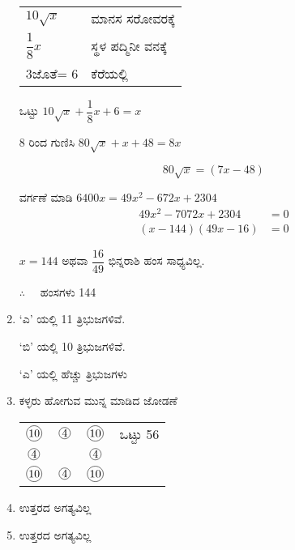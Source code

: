 \begin{enumerate}
\begin{tabular}[t]{ll}
$10 \sqrt{x}$ & ಮಾನಸ ಸರೋವರಕ್ಕೆ \\
$\dfrac{1}{8} x$ & ಸ್ಥಳ ಪದ್ಮಿನೀ ವನಕ್ಕೆ \\
$3$ಜೊತೆ= $6$ & ಕೆರೆಯಲ್ಲಿ
\end{tabular}

ಒಟ್ಟು $10\sqrt{x} + \dfrac{1}{8}x + 6 = x$

8 ರಿಂದ ಗುಣಿಸಿ $80\sqrt{x} + x + 48 = 8x$

$$80\sqrt{x} = (7x - 48)$$

ವರ್ಗಣೆ ಮಾಡಿ $6400x = 49x^{2} - 672x + 2304$
\begin{align*}
49x^{2} - 7072x + 2304 & = 0\\
(x - 144) (49x - 16) & = 0
\end{align*}
 
 $x = 144$ ಅಥವಾ $\dfrac{16}{49}$ ಭಿನ್ನರಾಶಿ ಹಂಸ ಸಾಧ್ಯವಿಲ್ಲ. 
 
 $\therefore\quad$ ಹಂಸಗಳು 144

\item `ಎ' ಯಲ್ಲಿ 11 ತ್ರಿಭುಜಗಳಿವೆ. 

`ಬಿ' ಯಲ್ಲಿ 10 ತ್ರಿಭುಜಗಳಿವೆ. 

`ಎ' ಯಲ್ಲಿ ಹೆಚ್ಚು ತ್ರಿಭುಜಗಳು 

\item ಕಳ್ಳರು ಹೋಗುವ ಮುನ್ನ ಮಾಡಿದ ಜೋಡಣೆ 

\begin{tabular}[t]{cccl}
$\mycirc{10}$ & $\mycirc{4}$ & $\mycirc{10}$ & ಒಟ್ಟು 56\\
$\mycirc{4}$ & & $\mycirc{4}$ & \\
$\mycirc{10}$ & $\mycirc{4}$ & $\mycirc{10}$
\end{tabular}

\item ಉತ್ತರದ ಅಗತ್ಯವಿಲ್ಲ 

\item ಉತ್ತರದ ಅಗತ್ಯವಿಲ್ಲ 
\end{enumerate}
